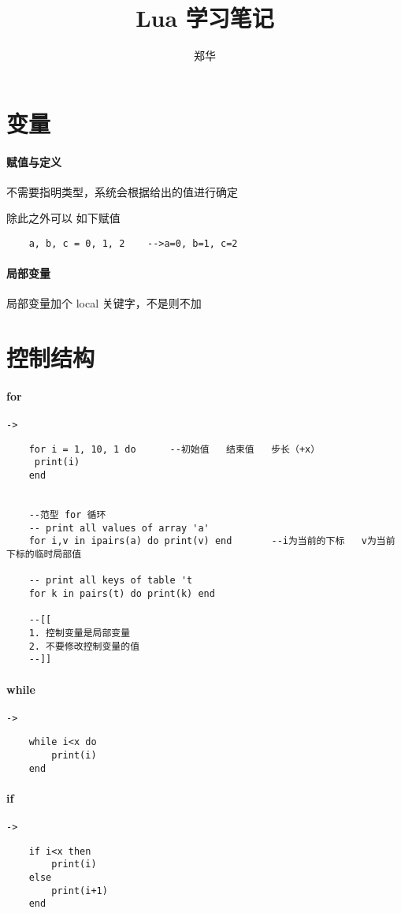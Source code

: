 \documentclass[UTF8,a4paper,12pt]{ctexart}
\author{\kaishu 郑华}
\title{Lua 学习笔记}
\begin{document}
 
 	\maketitle

\newpage
\section{变量}
	\paragraph{赋值与定义}
		不需要指明类型，系统会根据给出的值进行确定
		
		除此之外可以 如下赋值
		 \begin{lstlisting}
	a, b, c = 0, 1, 2    -->a=0, b=1, c=2
		 \end{lstlisting}
		 
	\paragraph{局部变量}
		局部变量加个 local 关键字，不是则不加
\newpage  

\section{控制结构}
	\paragraph{for}\verb|->|
		 \begin{lstlisting}
	for i = 1, 10, 1 do      --初始值   结束值   步长（+x）
	 print(i)
	end
	
	
	--范型 for 循环	  
	-- print all values of array 'a'
	for i,v in ipairs(a) do print(v) end       --i为当前的下标   v为当前下标的临时局部值
	
	-- print all keys of table 't
	for k in pairs(t) do print(k) end
	
	--[[
	1. 控制变量是局部变量
	2. 不要修改控制变量的值
	--]]
		 \end{lstlisting}

	\paragraph{while}\verb|->|
		 \begin{lstlisting}
	while i<x do
		print(i)
	end
		 \end{lstlisting}
	 
	 \paragraph{if}\verb|->|
		  \begin{lstlisting}
	if i<x then
		print(i)
	else
		print(i+1)
	end
		  \end{lstlisting}
\end{document}
